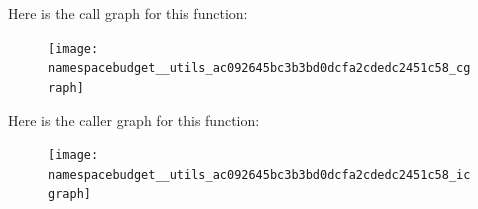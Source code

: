 Here is the call graph for this function\+:
\nopagebreak
\begin{figure}[H]
\begin{center}
\leavevmode
\texttt{[image: namespacebudget\_\_utils\_ac092645bc3b3bd0dcfa2cdedc2451c58\_cgraph]}
\end{center}
\end{figure}
Here is the caller graph for this function\+:
\nopagebreak
\begin{figure}[H]
\begin{center}
\leavevmode
\texttt{[image: namespacebudget\_\_utils\_ac092645bc3b3bd0dcfa2cdedc2451c58\_icgraph]}
\end{center}
\end{figure}
